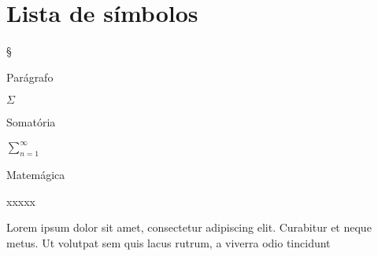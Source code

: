 \newcommand\simboloLargura{5ex} %
\newcommand\simboloGap{1ex} %
\newcommand\simboloNomeLargura{\dimexpr\linewidth-\simboloLargura-\simboloGap\relax}
\newcommand\simbolo[2]{\noindent\parbox[t]{\simboloLargura}{#1\strut}%
  \hspace{\simboloGap}%
  \parbox[t]{\simboloNomeLargura}{#2\strut}}

\chapter*{Lista de símbolos}

\simbolo{\S}{Parágrafo}

\simbolo{$\Sigma$}{Somatória}

\simbolo{$\sum_{n = 1}^{\infty}$}{Matemágica}

\simbolo{xxxxx}{Lorem ipsum dolor sit amet, consectetur adipiscing elit. Curabitur et neque metus. Ut volutpat sem quis lacus rutrum, a viverra odio tincidunt}